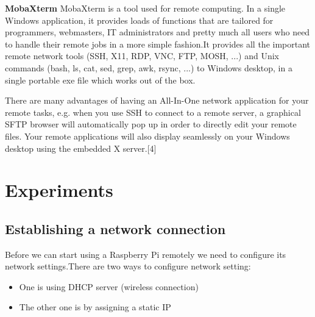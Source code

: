\documentclass[11pt,a4paper]{article}
\begin{document}
	\flushleft
	\textbf{MobaXterm}
	\vspace{0.4cm}
	\newline MobaXterm is a tool used for remote computing. In a single Windows application, it provides loads of functions that are tailored for programmers, webmasters, IT administrators and pretty much all users who need to handle their remote jobs in a more simple fashion.It provides all the important remote network tools (SSH, X11, RDP, VNC, FTP, MOSH, ...) and Unix commands (bash, ls, cat, sed, grep, awk, rsync, ...) to Windows desktop, in a single portable exe file which works out of the box. \newline
	
	There are many advantages of having an All-In-One network application for your remote tasks, e.g. when you use SSH to connect to a remote server, a graphical SFTP browser will automatically pop up in order to directly edit your remote files. Your remote applications will also display seamlessly on your Windows desktop using the embedded X server.[4]
		
	\newpage
	\section{Experiments}
	
	\subsection{Establishing a network connection}
	Before we can start using a Raspberry Pi remotely we need to configure its network settings.There are two ways to configure network setting:
	\begin{itemize}
		\item One is using DHCP server (wireless connection)
		\item The other one is by assigning a static IP
	\end{itemize}
	
\end{document}
